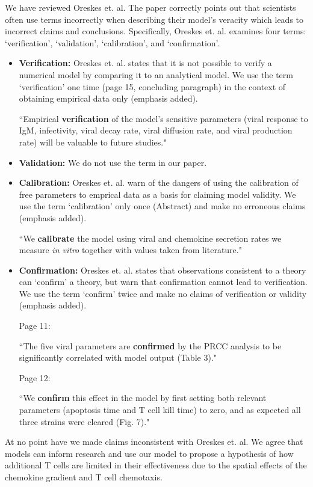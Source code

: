 \documentclass[10pt]{article}
\newenvironment{response}{\fontfamily{cmr}}{\par}
\begin{document}
\begin{enumerate}
\begin{response}
We have reviewed Oreskes et. al.  The paper correctly points out that scientists often use terms incorrectly when describing their model's veracity which leads to incorrect claims and conclusions.  Specifically, Oreskes et. al. examines four terms: `verification', `validation', `calibration', and `confirmation'.
\begin{itemize}
\item \textbf{Verification:} Oreskes et. al. states that it is not possible to verify a numerical model by comparing it to an analytical model.  We use the term `verification' one time (page 15, concluding paragraph) in the context of obtaining empirical data only (emphasis added).
\begin{displayquote}
``Empirical \textbf{verification} of the model's sensitive parameters (viral response to IgM, infectivity, viral decay rate, viral diffusion rate, and viral production rate) will be valuable to future studies."
\end{displayquote}
\item \textbf{Validation:} We do not use the term in our paper.
\item \textbf{Calibration:} Oreskes et. al. warn of the dangers of using the calibration of free parameters to emprical data as a basis for claiming model validity.  We use the term `calibration' only once (Abstract) and make no erroneous claims (emphasis added).
\begin{displayquote}
``We \textbf{calibrate} the model using viral and chemokine secretion rates we measure \textit{in vitro} together with values taken from literature."
\end{displayquote}
\item \textbf{Confirmation:} Oreskes et. al. states that observations consistent to a theory can `confirm' a theory, but warn that confirmation cannot lead to verification.  We use the term `confirm' twice and make no claims of verification or validity (emphasis added).

Page 11:
\begin{displayquote}
``The  five viral parameters are \textbf{confirmed} by the PRCC analysis to be significantly correlated with model output (Table 3)."
\end{displayquote}

Page 12:
\begin{displayquote}
``We \textbf{confirm} this effect in the model by first setting both relevant parameters (apoptosis time and T cell kill time) to zero, and as expected all three strains were cleared (Fig. 7)."
\end{displayquote}


\end{itemize}

At no point have we made claims inconsistent with Oreskes et. al.  We agree that models can inform research and use our model to propose a hypothesis of how additional T cells are limited in their effectiveness due to the spatial effects of the chemokine gradient and T cell chemotaxis.
\end{response}

\end{enumerate}
\end{document}
